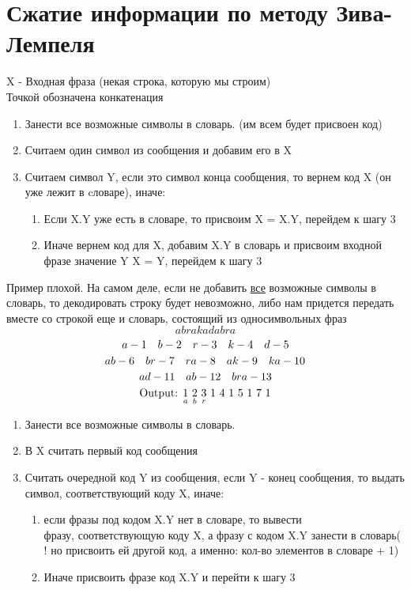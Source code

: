 \documentclass[discrete.tex]{subfiles}
\begin{document}
\section{Сжатие информации по методу Зива-Лемпеля}

\begin{definition} [Алгоритм]
    X - Входная фраза (некая строка, которую мы строим)\\
    Точкой обозначена конкатенация
    \begin{enumerate}
        \item Занести все возможные символы в словарь. (им всем будет присвоен код)
        \item Считаем один символ из сообщения и добавим его в X
        \item Считаем символ Y, если это символ конца сообщения, то вернем код X (он уже
            лежит в cловаре), иначе:
            \begin{enumerate}
                \item Если X.Y уже есть в словаре, то присвоим X = X.Y, перейдем к шагу 3
                \item Иначе вернем код для X, добавим X.Y в словарь и присвоим входной
                    фразе значение Y \q X = Y, перейдем к шагу 3
            \end{enumerate}
    \end{enumerate}
\end{definition}

\begin{example}
    Пример плохой. На самом деле, если не добавить \ul{все}
    возможные символы в словарь, то декодировать строку будет невозможно, либо нам придется передать вместе со строкой еще и словарь, состоящий из односимвольных фраз
    \[abrakadabra\]
    \[a - 1 \quad b - 2 \quad r - 3 \quad k - 4 \quad d - 5\]
    \[ab - 6 \quad br - 7 \quad ra - 8 \quad ak - 9 \quad ka - 10\]
    \[ad - 11 \quad ab - 12 \quad bra - 13\]
    \[\text{Output: } \us{a}{1} \ \us{b}{2} \ \us{r}{3} \ 1 \ 4 \ 1 \ 5 \ 1 \ 7 \ 1\]
\end{example}

\begin{definition} [Декодирование]
    \begin{enumerate}
        \item Занести все возможные символы в словарь.
        \item В X считать первый код сообщения
        \item Считать очередной код Y из сообщения, если Y - конец сообщения, то выдать
            символ, соответствующий коду X, иначе:
            \begin{enumerate}
                \item если фразы под кодом X.Y нет в словаре, то вывести\\ фразу,
                    соответствующую коду X, а фразу с кодом X.Y занести в словарь(
                    ! но присвоить ей другой код, а именно: кол-во элементов в словаре
                    + 1)
                \item Иначе присвоить фразе код X.Y и перейти к шагу 3
            \end{enumerate}
    \end{enumerate}
\end{definition}
\end{document}
